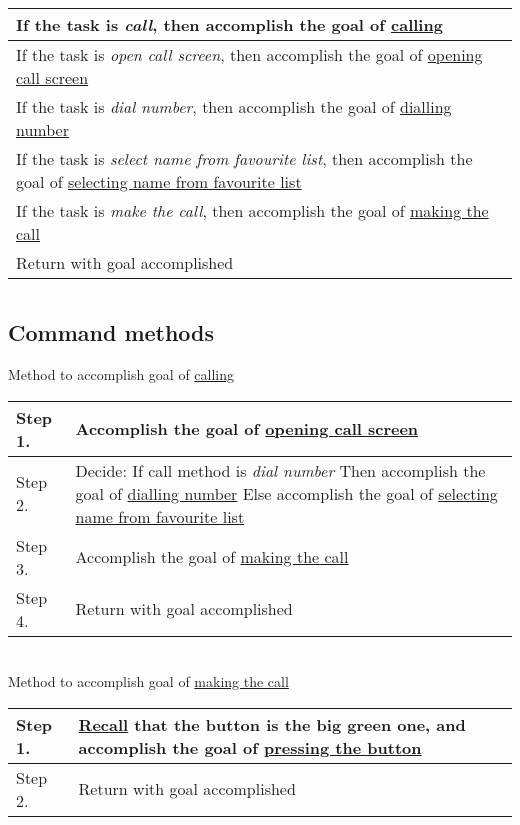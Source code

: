 \documentclass{article}
\begin{document}
\begin{tabulary}{\textwidth}{| L |}
	\hline
	If the task is \textit{call}, then accomplish the goal of \uline{calling} \\\hline
	If the task is \textit{open call screen}, then accomplish the goal of \uline{opening call screen} \\\hline
	If the task is \textit{dial number}, then accomplish the goal of \uline{dialling number} \\\hline
	If the task is \textit{select name from favourite list}, then accomplish the goal of \uline{selecting name from favourite list} \\\hline
	If the task is \textit{make the call}, then accomplish the goal of \uline{making the call} \\\hline
	Return with goal accomplished \\\hline
\end{tabulary}

\section{}
\subsection*{Command methods}
Method to accomplish goal of \uline{calling}

\begin{tabulary}{\textwidth}{| L | L |}
	\hline
	Step 1. & Accomplish the goal of \uline{opening call screen} \\\hline
	Step 2. & Decide: If call method is \textit{dial number} Then accomplish the goal of \uline{dialling number} Else accomplish the goal of \uline{selecting name from favourite list} \\\hline
	Step 3. & Accomplish the goal of \uline{making the call} \\\hline
	Step 4. & Return with goal accomplished \\\hline
\end{tabulary}\\

Method to accomplish goal of \uline{making the call}

\begin{tabulary}{\textwidth}{| L | L |}
	\hline
	Step 1. & \uline{Recall} that the button is the big green one, and accomplish the goal of \uline{pressing the button} \\\hline
	Step 2. & Return with goal accomplished \\\hline
\end{tabulary}\\
\end{document}
